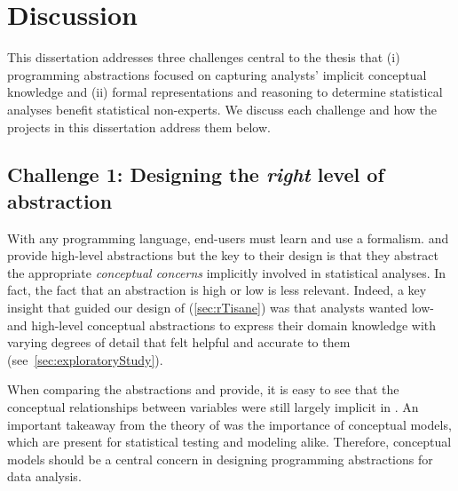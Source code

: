 \begin{comment}
\section{Impact} \label{sec:label}
\ej{Fill in}
\end{comment}

\section{Discussion} \label{sec:discussionChallenges} 

This dissertation addresses three challenges central to the thesis that (i)
programming abstractions focused on capturing analysts' implicit conceptual
knowledge and (ii) formal representations and reasoning to determine statistical
analyses benefit statistical non-experts. We discuss each challenge and how the
projects in this dissertation address them below. 

\subsection{Challenge 1: Designing the \textit{right} level of abstraction} 
With any programming language, end-users must learn and use a formalism. \tea
and \tisane provide high-level abstractions but the key to their design is that
they abstract the appropriate \textit{conceptual concerns} implicitly involved
in statistical analyses. In fact, the fact that an abstraction is high or low is
less relevant. Indeed, a key insight that guided our design of \rTisane
(\autoref{sec:rTisane}) was that analysts wanted low- and high-level conceptual
abstractions to express their domain knowledge with varying degrees of detail
that felt helpful and accurate to them (see~\autoref{sec:exploratoryStudy}).

When comparing the abstractions \tea and \tisane provide, it is easy to see that
the conceptual relationships between variables were still largely implicit in
\tea. An important takeaway from the theory of \hypoForm was the importance of
conceptual models, which are present for statistical testing and modeling alike.
Therefore, conceptual models should be a central concern in designing
programming abstractions for data analysis. 


